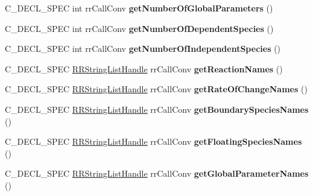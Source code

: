 \begin{DoxyCompactItemize}
\item 
\hypertarget{group__loadsave_ga2f33a70dfd6c68fb585cf5d1a9c1339c}{
\-C\-\_\-\-D\-E\-C\-L\-\_\-\-S\-P\-E\-C int rr\-Call\-Conv {\bfseries get\-Number\-Of\-Global\-Parameters} ()}
\label{group__loadsave_ga2f33a70dfd6c68fb585cf5d1a9c1339c}

\item 
\hypertarget{group__loadsave_ga7d573d16a02b3bf4361c00065f624e0b}{
\-C\-\_\-\-D\-E\-C\-L\-\_\-\-S\-P\-E\-C int rr\-Call\-Conv {\bfseries get\-Number\-Of\-Dependent\-Species} ()}
\label{group__loadsave_ga7d573d16a02b3bf4361c00065f624e0b}

\item 
\hypertarget{group__loadsave_ga29811c87b0f144e506c93373418fbe8b}{
\-C\-\_\-\-D\-E\-C\-L\-\_\-\-S\-P\-E\-C int rr\-Call\-Conv {\bfseries get\-Number\-Of\-Independent\-Species} ()}
\label{group__loadsave_ga29811c87b0f144e506c93373418fbe8b}

\item 
\hypertarget{group__loadsave_gafe6030585929ca78c5ce6d3944b11a1a}{
\-C\-\_\-\-D\-E\-C\-L\-\_\-\-S\-P\-E\-C \hyperlink{struct_r_r_string_list}{\-R\-R\-String\-List\-Handle} \*
rr\-Call\-Conv {\bfseries get\-Reaction\-Names} ()}
\label{group__loadsave_gafe6030585929ca78c5ce6d3944b11a1a}

\item 
\hypertarget{group__loadsave_ga1b676408037364f621f5bcb49a0f1474}{
\-C\-\_\-\-D\-E\-C\-L\-\_\-\-S\-P\-E\-C \hyperlink{struct_r_r_string_list}{\-R\-R\-String\-List\-Handle} \*
rr\-Call\-Conv {\bfseries get\-Rate\-Of\-Change\-Names} ()}
\label{group__loadsave_ga1b676408037364f621f5bcb49a0f1474}

\item 
\hypertarget{group__loadsave_gac0cfb68966bfb2656477f643a7f6494d}{
\-C\-\_\-\-D\-E\-C\-L\-\_\-\-S\-P\-E\-C \hyperlink{struct_r_r_string_list}{\-R\-R\-String\-List\-Handle} \*
rr\-Call\-Conv {\bfseries get\-Boundary\-Species\-Names} ()}
\label{group__loadsave_gac0cfb68966bfb2656477f643a7f6494d}

\item 
\hypertarget{group__loadsave_ga468d9d0cc8489ae85f4fd78d9fab343e}{
\-C\-\_\-\-D\-E\-C\-L\-\_\-\-S\-P\-E\-C \hyperlink{struct_r_r_string_list}{\-R\-R\-String\-List\-Handle} \*
rr\-Call\-Conv {\bfseries get\-Floating\-Species\-Names} ()}
\label{group__loadsave_ga468d9d0cc8489ae85f4fd78d9fab343e}

\item 
\hypertarget{group__loadsave_gabb7dd0b1f55a9f1c5ded728aa202027e}{
\-C\-\_\-\-D\-E\-C\-L\-\_\-\-S\-P\-E\-C \hyperlink{struct_r_r_string_list}{\-R\-R\-String\-List\-Handle} \*
rr\-Call\-Conv {\bfseries get\-Global\-Parameter\-Names} ()}
\label{group__loadsave_gabb7dd0b1f55a9f1c5ded728aa202027e}


\end{DoxyCompactItemize}
